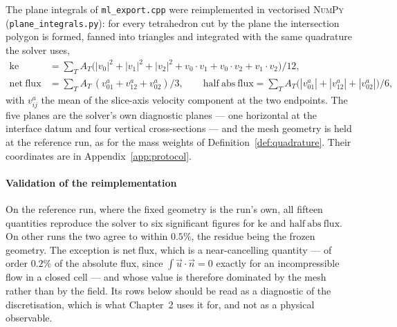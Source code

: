 \documentclass[11pt,a4paper]{article}
\theoremstyle{plain}
\theoremstyle{definition}
\theoremstyle{remark}
\begin{document}
The plane integrals of \texttt{ml\_export.cpp} were reimplemented in vectorised
\textsc{NumPy} (\texttt{plane\_integrals.py}): for every tetrahedron cut by the
plane the intersection polygon is formed, fanned into triangles and integrated
with the same quadrature the solver uses,
\begin{align}
\mathrm{ke} &= \textstyle\sum_T A_T\bigl(|v_0|^2+|v_1|^2+|v_2|^2+v_0\!\cdot\! v_1+v_0\!\cdot\! v_2+v_1\!\cdot\! v_2\bigr)/12,
\label{eq:planeke}\\
\mathrm{net\ flux} &= \textstyle\sum_T A_T\,(v^a_{01}+v^a_{12}+v^a_{02})/3,
\qquad
\mathrm{half\ abs\ flux} = \textstyle\sum_T A_T\bigl(|v^a_{01}|+|v^a_{12}|+|v^a_{02}|\bigr)/6,
\label{eq:planeflux}
\end{align}
with $v^a_{ij}$ the mean of the slice-axis velocity component at the two
endpoints. The five planes are the solver's own diagnostic planes --- one
horizontal at the interface datum and four vertical cross-sections --- and the
mesh geometry is held at the reference run, as for the mass weights of
Definition~\ref{def:quadrature}. Their coordinates are in
Appendix~\ref{app:protocol}.

\label{meas:planes-valid}
\paragraph{Validation of the reimplementation}
On the reference run, where the fixed geometry is the run's own, all fifteen
quantities reproduce the solver to six significant figures for
$\mathrm{ke}$ and $\mathrm{half\ abs\ flux}$. On other runs the two agree to
within $0.5\%$, the residue being the frozen geometry. The exception is
$\mathrm{net\ flux}$, which is a near-cancelling quantity --- of order $0.2\%$ of
the absolute flux, since $\int\vec{u}\cdot\vec{n} = 0$ exactly for an
incompressible flow in a closed cell --- and whose value is therefore dominated
by the mesh rather than by the field. Its rows below should be read as a
diagnostic of the discretisation, which is what Chapter~2 uses it for, and not
as a physical observable.
\end{document}

